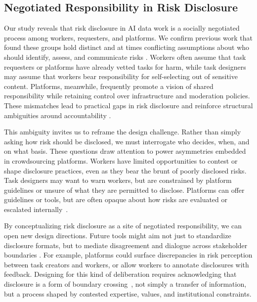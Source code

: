 \subsection{Negotiated Responsibility in Risk Disclosure}
Our study reveals that risk disclosure in AI data work is a socially negotiated process among workers, requesters, and platforms. We confirm previous work that found these groups hold distinct and at times conflicting assumptions about who should identify, assess, and communicate risks \cite{fieseler_unfairness_2019}. Workers often assume that task requesters or platforms have already vetted tasks for harm, while task designers may assume that workers bear responsibility for self-selecting out of sensitive content. Platforms, meanwhile, frequently promote a vision of shared responsibility while retaining control over infrastructure and moderation policies. These mismatches lead to practical gaps in risk disclosure and reinforce structural ambiguities around accountability \cite{Suchman2002LocatedAccountabilities, widder_dislocated_2023}.


This ambiguity invites us to reframe the design challenge. Rather than simply asking how risk should be disclosed, we must interrogate who decides, when, and on what basis. These questions draw attention to power asymmetries embedded in crowdsourcing platforms. Workers have limited opportunities to contest or shape disclosure practices, even as they bear the brunt of poorly disclosed risks. Task designers may want to warn workers, but are constrained by platform guidelines or unsure of what they are permitted to disclose. Platforms can offer guidelines or tools, but are often opaque about how risks are evaluated or escalated internally~\cite{roberts2019behind}.

By conceptualizing risk disclosure as a site of negotiated responsibility, we can open new design directions. Future tools might aim not just to standardize disclosure formats, but to mediate disagreement and dialogue across stakeholder boundaries \cite{fieseler_unfairness_2019}. For example, platforms could surface discrepancies in risk perception between task creators and workers, or allow workers to annotate disclosures with feedback. Designing for this kind of deliberation requires acknowledging that disclosure is a form of boundary crossing~\cite{Suchman2002LocatedAccountabilities}, not simply a transfer of information, but a process shaped by contested expertise, values, and institutional constraints.

